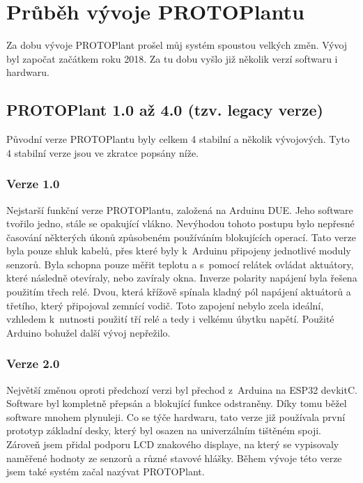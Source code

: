 \chapter{Průběh vývoje PROTOPlantu}
Za dobu vývoje PROTOPlant prošel můj systém spoustou velkých změn.
Vývoj byl započat začátkem roku 2018.
Za tu dobu vyšlo již několik verzí softwaru i hardwaru.

\section{PROTOPlant 1.0 až 4.0 (tzv. legacy verze)}
Původní verze PROTOPlantu byly celkem 4 stabilní a několik vývojových.
Tyto 4 stabilní verze jsou ve zkratce popsány níže.

\subsection{Verze 1.0}
Nejstarší funkční verze PROTOPlantu, založená na Arduinu DUE. 
Jeho software tvořilo jedno, stále se opakující vlákno.
Nevýhodou tohoto postupu bylo nepřesné časování některých úkonů způsobeném používáním blokujících operací.
Tato verze byla pouze shluk kabelů, přes které byly k~Arduinu připojeny jednotlivé moduly senzorů.
Byla schopna pouze měřit teplotu a s~pomocí relátek ovládat aktuátory, které následně otevíraly, nebo zavíraly okna.
Inverze polarity napájení byla řešena použitím třech relé.
Dvou, která křížově spínala kladný pól napájení aktuátorů a třetího, který připojoval zemnící vodič.
Toto zapojení nebylo zcela ideální, vzhledem k~nutnosti použití tří relé a tedy i velkému úbytku napětí.
Použité Arduino bohužel další vývoj nepřežilo.

\subsection{Verze 2.0}
Největší změnou oproti předchozí verzi byl přechod z~Arduina na ESP32 devkitC.
Software byl kompletně přepsán a blokující funkce odstraněny.
Díky tomu běžel software mnohem plynuleji.
Co se týče hardwaru, tato verze již používala první prototyp základní desky, který byl osazen na univerzálním tištěném spoji.
Zároveň jsem přidal podporu LCD znakového displaye, na který se vypisovaly naměřené hodnoty ze senzorů a různé stavové hlášky.
Během vývoje této verze jsem také systém začal nazývat PROTOPlant.

